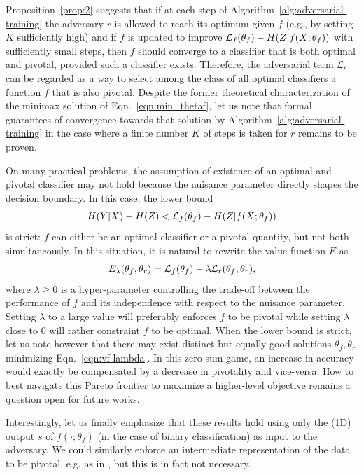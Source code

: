 \documentclass{article}
\theoremstyle{plain}
\begin{document}
Proposition~\ref{prop:2} suggests that if at each step of
Algorithm~\ref{alg:adversarial-training} the adversary $r$ is allowed to reach
its optimum given $f$ (e.g., by setting $K$ sufficiently high) and if $f$ is
updated to improve ${\cal L}_f(\theta_f) -  H({Z|f(X;\theta_f)})$ with
sufficiently small steps, then $f$ should converge to a classifier that is both
optimal and pivotal, provided such a classifier exists. Therefore, the adversarial term ${\cal L}_r$
can be regarded as a way to select among
the class of all optimal classifiers a function $f$ that is also pivotal.
Despite the former theoretical characterization of the minimax solution
of Eqn.~\ref{eqn:min_thetaf}, let us note that formal guarantees of
convergence towards that solution by
Algorithm~\ref{alg:adversarial-training} in the case where a finite number $K$
of steps is taken for $r$ remains to be proven.

On many practical problems, the assumption of existence of an optimal and pivotal classifier may
not hold because the nuisance parameter directly shapes the decision boundary.
In this case, the lower bound
\begin{equation}\label{eqn:lower-bound-strict}
    H({Y|X}) - H(Z) < {\cal L}_f(\theta_f) - H({Z|f(X;\theta_f)})
\end{equation} is strict: $f$ can either be an optimal classifier or a
pivotal quantity, but not both simultaneously. In this situation, it is natural
to rewrite the value function $E$  as
\begin{equation}\label{eqn:vf-lambda}
    E_\lambda(\theta_f, \theta_r) = {\cal L}_f(\theta_f) - \lambda {\cal L}_r(\theta_f, \theta_r),
\end{equation}
where $\lambda \geq 0$ is a hyper-parameter controlling the trade-off between
the performance of $f$ and its independence with respect to the nuisance
parameter. Setting $\lambda$ to a large value will preferably enforces $f$ to be
pivotal while setting $\lambda$ close to $0$ will rather constraint $f$ to be
optimal. When the lower bound is strict, let us note however that there may
exist distinct but equally good solutions $\theta_f,\theta_r$ minimizing
Eqn.~\ref{eqn:vf-lambda}. In this zero-sum game, an increase in accuracy would
exactly be compensated by a decrease in pivotality and vice-versa. How to best
navigate this Pareto frontier to maximize a higher-level objective remains a
question open for future works.

Interestingly, let us finally emphasize that these results hold using only the
(1D) output $s$ of $f(\cdot;\theta_f)$ (in the case of binary classification) as
input to the adversary. We could similarly enforce an intermediate
representation of the data to be pivotal, e.g. as in
\citep{ganin2014unsupervised}, but this is in fact not necessary.
\end{document}
